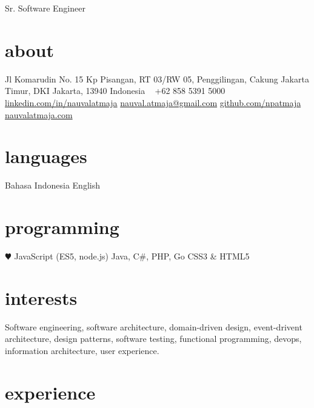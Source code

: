 \documentclass[]{friggeri-cv}
\begin{document}
       {Sr. Software Engineer}


\begin{aside}
  \section{about}
  	Jl Komarudin No. 15
  	Kp Pisangan, RT 03/RW 05,
  	Penggilingan, Cakung
  	Jakarta Timur,
  	DKI Jakarta, 13940
  	Indonesia
    ~
    +62 858 5391 5000
    ~
    \href{https://www.linkedin.com/in/nauvalatmaja/}{linkedin.com/in/nauvalatmaja}
    \href{mailto:nauval.atmaja@gmail.com}{nauval.atmaja@gmail.com}
    \href{https://github.com/npatmaja}{github.com/npatmaja}
    \href{http://nauvalatmaja.com}{nauvalatmaja.com}
  \section{languages}
  	Bahasa Indonesia
  	English
  \section{programming}
    {\color{red} $\varheartsuit$} JavaScript
    (ES5, node.js)
    Java, C\#, PHP, Go
    CSS3 \& HTML5
\end{aside}

\section{interests}

Software engineering, software architecture, domain-driven design, event-drivent architecture,
design patterns, software testing, functional programming, devops, information architecture,
user experience.

\section{experience}
\end{document}

